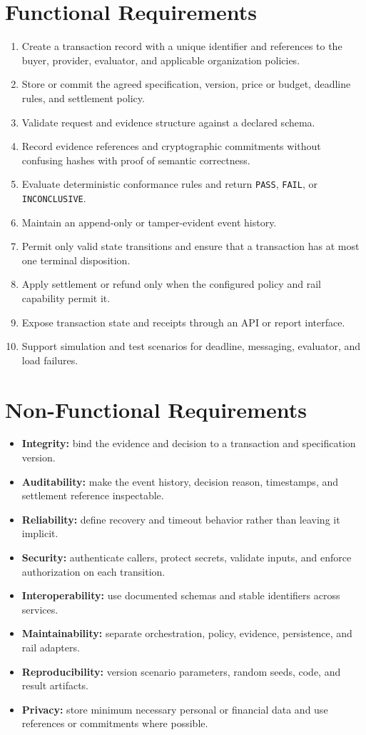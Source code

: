 \documentclass[12pt,a4paper,oneside]{report}
\begin{document}
\section{Functional Requirements}
\begin{enumerate}[leftmargin=*]
\item Create a transaction record with a unique identifier and references to the buyer, provider, evaluator, and applicable organization policies.
\item Store or commit the agreed specification, version, price or budget, deadline rules, and settlement policy.
\item Validate request and evidence structure against a declared schema.
\item Record evidence references and cryptographic commitments without confusing hashes with proof of semantic correctness.
\item Evaluate deterministic conformance rules and return \texttt{PASS}, \texttt{FAIL}, or \texttt{INCONCLUSIVE}.
\item Maintain an append-only or tamper-evident event history.
\item Permit only valid state transitions and ensure that a transaction has at most one terminal disposition.
\item Apply settlement or refund only when the configured policy and rail capability permit it.
\item Expose transaction state and receipts through an API or report interface.
\item Support simulation and test scenarios for deadline, messaging, evaluator, and load failures.
\end{enumerate}

\section{Non-Functional Requirements}
\begin{itemize}[leftmargin=*]
\item \textbf{Integrity:} bind the evidence and decision to a transaction and specification version.
\item \textbf{Auditability:} make the event history, decision reason, timestamps, and settlement reference inspectable.
\item \textbf{Reliability:} define recovery and timeout behavior rather than leaving it implicit.
\item \textbf{Security:} authenticate callers, protect secrets, validate inputs, and enforce authorization on each transition.
\item \textbf{Interoperability:} use documented schemas and stable identifiers across services.
\item \textbf{Maintainability:} separate orchestration, policy, evidence, persistence, and rail adapters.
\item \textbf{Reproducibility:} version scenario parameters, random seeds, code, and result artifacts.
\item \textbf{Privacy:} store minimum necessary personal or financial data and use references or commitments where possible.
\end{itemize}
\end{document}
